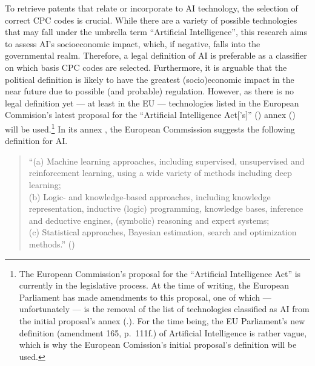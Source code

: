 \documentclass[
  12pt,
  a4paperpaper,
]{article}
\begin{document}
To retrieve patents that relate or incorporate to AI technology, the
selection of correct CPC codes is crucial. While there are a variety of
possible technologies that may fall under the umbrella term ``Artificial
Intelligence'', this research aims to assess AI's socioeconomic impact,
which, if negative, falls into the governmental realm. Therefore, a
legal definition of AI is preferable as a classifier on which basis CPC
codes are selected. Furthermore, it is arguable that the political
definition is likely to have the greatest (socio)economic impact in the
near future due to possible (and probable) regulation. However, as there
is no legal definition yet --- at least in the EU --- technologies
listed in the European Commision's latest proposal for the ``Artificial
Intelligence Act{[}'s{]}''
() annex () will be used.\footnote{The European Commission's
  proposal for the ``Artificial Intelligence Act'' is currently in the
  legislative process. At the time of writing, the European Parliament
  has made amendments to this proposal, one of which --- unfortunately
  --- is the removal of the list of technologies classified as AI from
  the initial proposal's annex
  (.). For the time being, the EU Parliament's new
  definition (amendment 165, p.~111f.) of Artificial Intelligence is
  rather vague, which is why the European Comission's initial proposal's
  definition will be used.} In its annex , the European
Commsission suggests the following definition for AI.


\begin{quote}
``(a) Machine learning approaches, including supervised, unsupervised
and reinforcement learning, using a wide variety of methods including
deep learning;\\
(b) Logic- and knowledge-based approaches, including knowledge
representation, inductive (logic) programming, knowledge bases,
inference and deductive engines, (symbolic) reasoning and expert
systems;\\
(c) Statistical approaches, Bayesian estimation, search and optimization
methods.'' ()
\end{quote}

\end{document}
